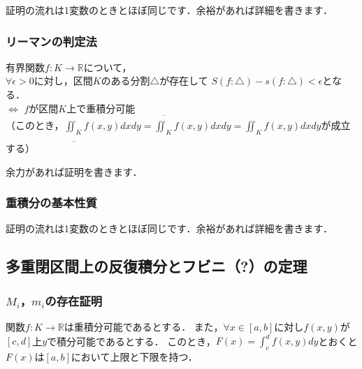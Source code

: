 \documentclass[./index]{subfiles}
\begin{document}
証明の流れは1変数のときとほぼ同じです．余裕があれば詳細を書きます．

\subsubsection{リーマンの判定法}
\begin{screen}
    \begin{proposition}
        有界関数$f: K \rightarrow \mathbb{R}$について， \\
        $\forall \epsilon > 0$に対し，区間$K$のある分割$\triangle$が存在して
        $S(f: \triangle) - s(f: \triangle) < \epsilon$となる． \\
        \quad $\Longleftrightarrow$ $f$が区間$K$上で重積分可能 \\
        （このとき，$\underline{\iint_K} f(x, y) dx dy = \overline{\iint_K} f(x, y) dx dy
            = \iint_K f(x, y) dx dy$が成立する）
    \end{proposition}
\end{screen}

余力があれば証明を書きます．

\subsubsection{重積分の基本性質}

証明の流れは1変数のときとほぼ同じです．余裕があれば詳細を書きます．

\subsection{多重閉区間上の反復積分とフビニ（?）の定理}
\subsubsection{$M_i$，$m_i$の存在証明}
\begin{screen}
    \begin{proposition}
        関数$f: K \rightarrow \mathbb{R}$は重積分可能であるとする．
        また，$\forall x \in [a, b]$に対し$f(x, y)$が$[c, d]$上$y$で積分可能であるとする．
        このとき，$F(x) = \int_c^d f(x, y) dy$とおくと$F(x)$は$[a, b]$において上限と下限を持つ．
    \end{proposition}
\end{screen}
\end{document}
